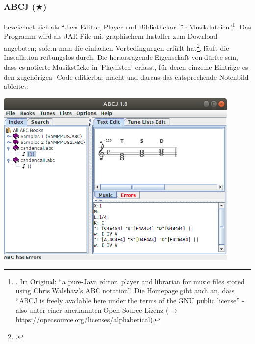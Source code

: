 %
%
%



\subsubsection{ABCJ ($\bigstar$)}

\label{ABCJ} bezeichnet sich als \enquote{Java Editor, Player und
Bibliothekar für Musikdateien}\footnote{\cite[vgl.][\nopage wp]{Spencer2019a}.
Im Original: \enquote{a pure-Java editor, player and librarian for music files
stored using Chris Walshaw's ABC notation}. Die Homepage gibt auch an, dass
\enquote{ABCJ is freely available here under the terms of the GNU public
license} - also unter einer anerkannten Open-Source-Lizenz ($\rightarrow$
\href{https://opensource.org/licenses/alphabetical}
{https://opensource.org/licenses/alphabetical}).}. Das Programm wird als JAR-File
mit graphischem Installer zum Download angeboten; sofern man die einfachen
Vorbedingungen erfüllt hat\footcite[vgl.][\nopage wp]{Spencer2019a}, läuft die
Installation reibungslos durch. Die herausragende Eigenschaft von 
dürfte sein, dass es  notierte Musikstücke in 'Playlisten' erfasst, für
deren einzelne Einträge es den zugehörigen -Code editierbar macht und
daraus  das entsprechende Notenbild ableitet:

\begin{center}
\includegraphics[width=0.9\textwidth]{frontends/abcj/abcj-cadenca1-300dpi.png}
\end{center}

